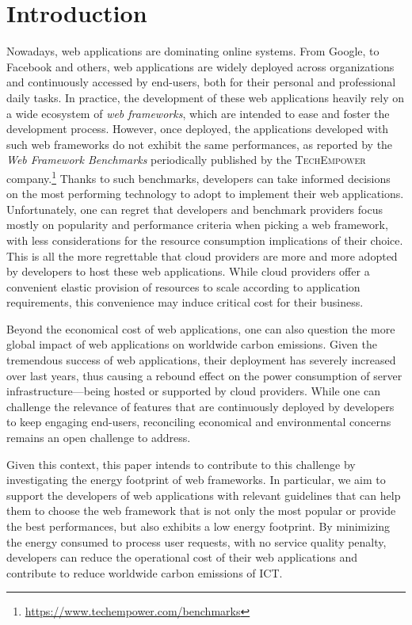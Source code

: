 
\section{Introduction}
Nowadays, web applications are dominating online systems.
From Google, to Facebook and others, web applications are widely deployed across organizations and continuously accessed by end-users, both for their personal and professional daily tasks.
In practice, the development of these web applications heavily rely on a wide ecosystem of \emph{web frameworks}, which are intended to ease and foster the development process.
However, once deployed, the applications developed with such web frameworks do not exhibit the same performances, as reported by the \emph{Web Framework Benchmarks} periodically published by the \textsc{TechEmpower} company.\footnote{\url{https://www.techempower.com/benchmarks}}
Thanks to such benchmarks, developers can take informed decisions on the most performing technology to adopt to implement their web applications.
Unfortunately, one can regret that developers and benchmark providers focus mostly on popularity and performance criteria when picking a web framework, with less considerations for the resource consumption implications of their choice.
This is all the more regrettable that cloud providers are more and more adopted by developers to host these web applications.
While cloud providers offer a convenient elastic provision of resources to scale according to application requirements, this convenience may induce critical cost for their business.

Beyond the economical cost of web applications, one can also question the more global impact of web applications on worldwide carbon emissions.
Given the tremendous success of web applications, their deployment has severely increased over last years, thus causing a rebound effect on the power consumption of server infrastructure---being hosted or supported by cloud providers.
While one can challenge the relevance of features that are continuously deployed by developers to keep engaging end-users, reconciling economical and environmental concerns remains an open challenge to address.

Given this context, this paper intends to contribute to this challenge by investigating the energy footprint of web frameworks.
In particular, we aim to support the developers of web applications with relevant guidelines that can help them to choose the web framework that is not only the most popular or provide the best performances, but also exhibits a low energy footprint.
By minimizing the energy consumed to process user requests, with no service quality penalty, developers can reduce the operational cost of their web applications and contribute to reduce worldwide carbon emissions of ICT.

